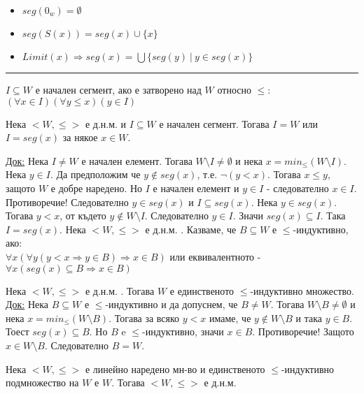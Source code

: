 \documentclass[fleqn, titlepage, 12pt]{report}
\begin{document}
\begin{itemize}
  \item $ seg(0_w) = \emptyset $
  \item $ seg(S(x)) = seg(x) \cup \{ x \} $
  \item $ Limit(x) \Rightarrow seg(x) = \bigcup \{ seg(y)\ |\ y \in seg(x) \} $
\end{itemize}

\bigbreak
\hrule
\bigbreak

$ I \subseteq W $ е начален сегмент, ако е затворено над $ W $ относно $ \leq $:
$ (\forall{x \in I})(\forall{y \leq x}) (y \in I) $
\bigbreak

 Нека $ <W,\leq> $ е д.н.м. и $ I \subseteq W $ е начален сегмент. Тогава $ I = W $ или $ I = seg(x) $
за някое $ x \in W $.
\bigbreak

\underline{Док:} Нека $ I \neq W $ е начален елемент.
Тогава $ W \setminus I \neq \emptyset $ и нека $ x = min_{\leq} (W \setminus I)$. Нека $ y \in I $.
Да предположим че $ y \notin seg(x) $, т.е. $ \lnot (y < x) $. Тогава $ x \leq y $, защото $ W $ е добре наредено.
Но $ I $ е начален елемент и $ y \in I $ - следователно $ x \in I $. Противоречие! Следователно $ y \in seg(x) $
и $ I \subseteq seg(x) $.
\bigbreak
Нека $ y \in seg(x) $. Тогава $ y < x $, от където $ y \notin W \setminus I $. Следователно $ y \in I $.
Значи $ seg(x) \subseteq I $.
\bigbreak
Така $ I = seg(x) $.
\bigbreak
{} Нека $ <W,\leq> $ е д.н.м. . Казваме, че $ B \subseteq W $ е $ \leq $-индуктивно, ако:\\
$ \forall{x}(\forall{y}(y < x \Rightarrow y \in B) \Rightarrow x \in B) $ или еквивалентното - 
$ \forall{x}(seg(x) \subseteq B \Rightarrow x \in B) $

 Нека $ <W,\leq> $ е д.н.м. . Тогава $ W $ е единственото $ \leq $-индуктивно множество.
\bigbreak
\underline{Док:} Нека $ B \subseteq W $ е $ \leq $-индуктивно и да допуснем, че $ B \neq W $.
Тогава $ W \setminus B \neq \emptyset $ и нека $ x = min_{\leq} (W \setminus B)$. Тогава за всяко $ y < x $ имаме, че
$ y \notin W \setminus B $ и така $ y \in B $. Тоест $ seg(x) \subseteq B $.
Но $ B $ e $ \leq $-индуктивно, значи $ x \in B $. Противоречие! Защото $ x \in W \setminus B $.
Следователно $ B = W $.
\bigbreak

 Нека $ <W, \leq> $ е линейно наредено мн-во и единственото $ \leq $-индуктивно подмножество на $ W $ е $ W $.
Тогава $ <W, \leq> $ е д.н.м.
\bigbreak
\end{document}
